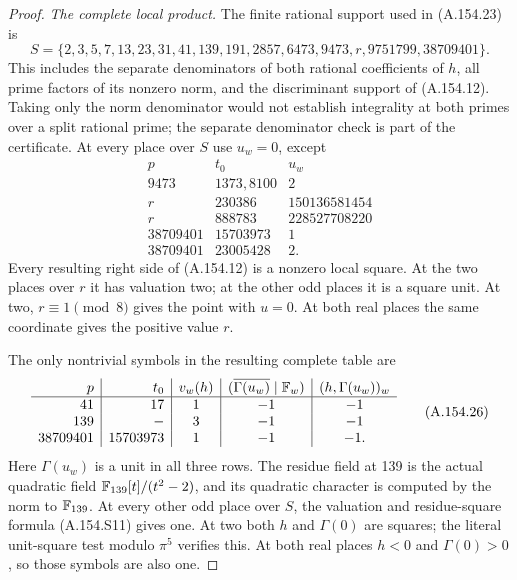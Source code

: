 \begin{proof}
\emph{The complete local product.}
The finite rational support used in (A.154.23) is
\[
 S=\{2,3,5,7,13,23,31,41,139,191,2857,6473,
                           9473,r,9751799,38709401\}.
\tag{A.154.24}
\]
This includes the separate denominators of both rational
coefficients of \(h\), all prime factors of its nonzero
norm, and the discriminant support of (A.154.12).
Taking only the norm denominator would not establish
integrality at both primes over a split rational prime;
the separate denominator check is part of the certificate.
At every place over \(S\) use \(u_w=0\), except
\[
\begin{array}{r|r|r}
p&t_0&u_w\\\hline
9473&1373,8100&2\\
r&230386&150136581454\\
r&888783&228527708220\\
38709401&15703973&1\\
38709401&23005428&2.
\end{array}
\tag{A.154.25}
\]
Every resulting right side of (A.154.12) is a nonzero
local square.  At the two places over \(r\) it has
valuation two; at the other odd places it is a square
unit.  At two, \(r\equiv1\pmod8\) gives the point
with \(u=0\).  At both real places the same coordinate
gives the positive value \(r\).

The only nontrivial symbols in the resulting complete
table are
\[
\begin{array}{r|r|c|c|c}
p&t_0&v_w(h)&
 (\overline{\Gamma(u_w)}\mid\mathbb F_w)&(h,\Gamma(u_w))_w\\\hline
41&17&1&-1&-1\\
139&-&3&-1&-1\\
38709401&15703973&1&-1&-1.
\end{array}
\tag{A.154.26}
\]
Here \(\Gamma(u_w)\) is a unit in all three rows.
The residue field at 139 is the actual quadratic field
\(\mathbb F_{139}[t]/(t^2-2)\), and its quadratic character is
computed by the norm to \(\mathbb F_{139}\).
At every other odd place over \(S\), the valuation and
residue-square formula (A.154.S11) gives one.
At two both \(h\) and \(\Gamma(0)\) are squares; the
literal unit-square test modulo \(\pi^5\) verifies this.
At both real places \(h<0\) and \(\Gamma(0)>0\), so
those symbols are also one.


\end{proof}
